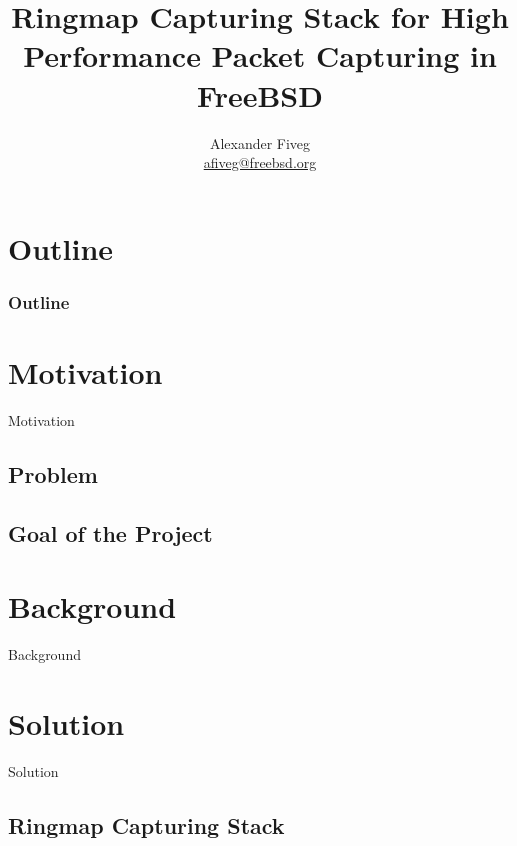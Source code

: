 \documentclass{beamer}
\title{Ringmap Capturing Stack for High Performance Packet Capturing in FreeBSD}
\author[Alexander Fiveg]{ Alexander Fiveg \\
\url{afiveg@freebsd.org} }
\begin{document}
\frame{\titlepage}



\section*{Outline}
\begin{frame}
\frametitle{Outline}
\tableofcontents
\end{frame}


%


\section{Motivation}
\begin{frame}
	\begin{center}
	\huge{Motivation}
	\end{center}
\end{frame}

\subsection*{Problem}


\subsection*{Goal of the Project}



%


\section{Background}
\begin{frame}
	\begin{center}
	\huge{Background}
	\end{center}
\end{frame}



%


\section{Solution}
\begin{frame}
	\begin{center}
	\huge{Solution}
	\end{center}
\end{frame}

\subsection*{Ringmap Capturing Stack}

\end{document}
